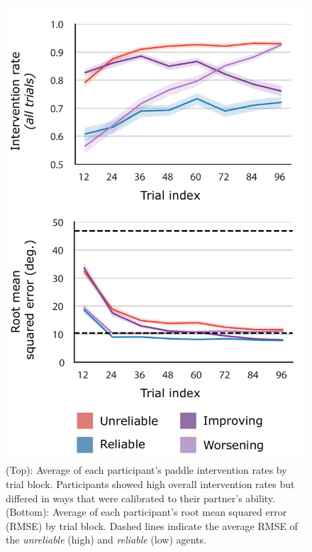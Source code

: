 \documentclass[10pt,letterpaper]{article}
\begin{document}
\begin{figure}[H]
\begin{center}
\includegraphics[width=\linewidth]{img/rmse_intervention_rate.pdf}
\end{center}
\caption{(Top): Average of each participant's paddle intervention rates by trial block. Participants showed high overall intervention rates but differed in ways that were calibrated to their partner's ability. (Bottom): Average of each participant's root mean squared error (RMSE) by trial block. Dashed lines indicate the average RMSE of the \textit{unreliable} (high) and \textit{reliable} (low) agents.}
\label{fig:rmse}
\end{figure}
\end{document}
